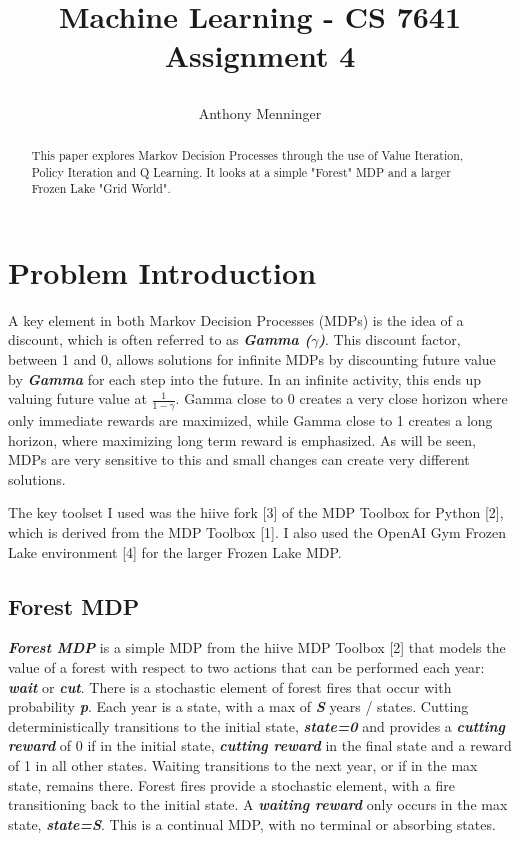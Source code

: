 \documentclass[letterpaper]{article} %
\title{
Machine Learning - CS 7641
Assignment 4
	
}
\author {
    Anthony Menninger \\
}
\begin{document}
\maketitle

\begin{abstract}
This paper explores Markov Decision Processes through the use of Value Iteration, Policy Iteration and Q Learning.  It looks at a simple "Forest" MDP and a larger Frozen Lake "Grid World".
\end{abstract}

\section{Problem Introduction}

A key element in both Markov Decision Processes (MDPs) is the idea of a discount, which is often referred to as \textbf{\emph{Gamma ($\gamma$)}}.  This discount factor, between 1 and 0, allows solutions for infinite MDPs by discounting future value by \textbf{\emph{Gamma}} for each step into the future.  In an infinite activity, this ends up valuing future value at $ \frac{1}{1- \gamma}$.  Gamma close to 0 creates a very close horizon where only immediate rewards are maximized, while Gamma close to 1 creates a long horizon, where maximizing long term reward is emphasized.  As will be seen, MDPs are very sensitive to this and small changes can create very different solutions.

The key toolset I used was the hiive fork [3] of the MDP Toolbox for Python [2], which is derived from the MDP Toolbox [1].  I also used the OpenAI Gym Frozen Lake environment [4] for the larger Frozen Lake MDP.

\subsection{Forest MDP}
\textbf{\emph{Forest MDP}} is a simple MDP from the hiive MDP Toolbox [2] that models the value of a forest with respect to two actions that can be performed each year: \textbf{\emph{wait}} or \textbf{\emph{cut}}.  There is a stochastic element of forest fires that occur with probability \textbf{\emph{p}}.  Each year is a state, with a max of \textbf{\emph{S}} years / states.  Cutting deterministically transitions to the initial state,  \textbf{\emph{state=0}} and provides a \textbf{\emph{cutting reward}} of 0 if in the initial state, \textbf{\emph{cutting reward}} in the final state and a reward of 1 in all other states.  Waiting transitions to the next year, or if in the max state, remains there.  Forest fires provide a stochastic element, with a fire transitioning back to the initial state.  A \textbf{\emph{waiting reward}} only occurs in the max state, \textbf{\emph{state=S}}.  This is a continual MDP, with no terminal or absorbing states. 
\end{document}
